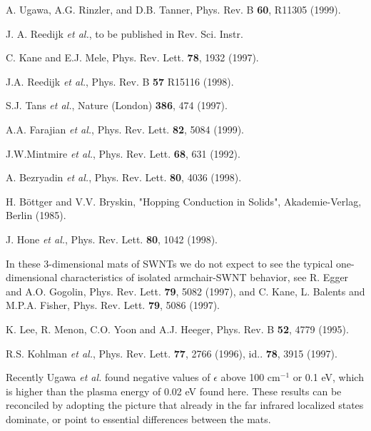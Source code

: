 \begin{multicols}{2}
\begin{thebibliography}{10}
A. Ugawa, A.G. Rinzler, and D.B. Tanner, Phys. Rev. B {\bf 60}, R11305
(1999).

{J. A. Reedijk {\sl et al.}, to be published in Rev. Sci. Instr.}

{C. Kane and E.J. Mele, Phys. Rev. Lett. {\bf 78}, 1932 (1997). }

{J.A. Reedijk {\sl et al.}, Phys. Rev. B {\bf 57} R15116 (1998).}

{S.J. Tans {\sl et al.}, Nature (London) {\bf 386}, 474 (1997). }

{A.A. Farajian {\sl et al.}, Phys. Rev. Lett. {\bf 82}, 5084 (1999). }

{J.W.Mintmire {\sl et al.}, Phys. Rev. Lett. {\bf 68}, 631 (1992). }

{A. Bezryadin {\sl et al.}, Phys. Rev. Lett. {\bf 80}, 4036 (1998). }

{H. B\"{o}ttger and V.V. Bryskin, "Hopping Conduction in Solids",
Akademie-Verlag, Berlin (1985). }

{J. Hone {\sl et al.}, Phys. Rev. Lett. {\bf 80}, 1042 (1998). }

 In these 3-dimensional mats of SWNTs we do not expect to see the
typical one-dimensional characteristics of isolated armchair-SWNT behavior,
see R. Egger and A.O. Gogolin, Phys. Rev. Lett. {\bf 79}, 5082 (1997), and
C. Kane, L. Balents and M.P.A. Fisher, Phys. Rev. Lett. {\bf 79}, 5086
(1997).

K. Lee, R. Menon, C.O. Yoon and A.J. Heeger, Phys. Rev. B {\bf 52}, 4779
(1995).

{R.S. Kohlman {\sl et al.}, Phys. Rev. Lett. {\bf 77}, 2766 (1996), id..
{\bf 78}, 3915 (1997). }

 Recently Ugawa {\it et al.}\cite{Ugawa99} found negative
values of $\epsilon$ above 100 cm$^{-1}$ or 0.1 eV, which is higher than the
plasma energy of 0.02 eV found here. These results
can be reconciled by adopting the picture that already in the far infrared
localized states dominate, or point to essential differences between the
mats.

\end{thebibliography}

\end{multicols}

